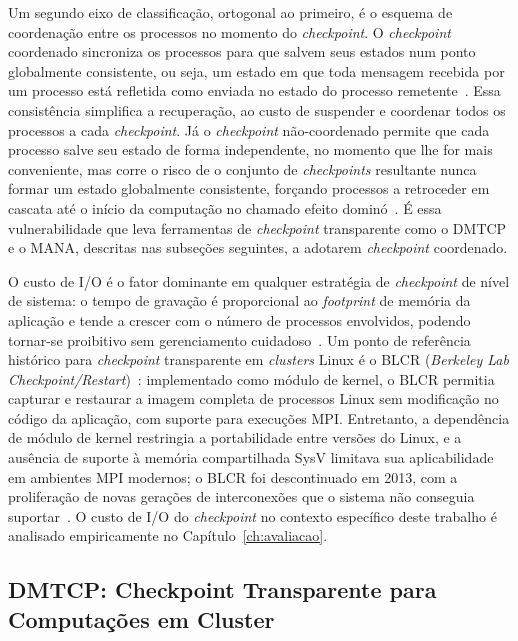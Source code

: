 Um segundo eixo de classificação, ortogonal ao primeiro, é o esquema de coordenação
entre os processos no momento do \textit{checkpoint}. O \textit{checkpoint} coordenado sincroniza os
processos para que salvem seus estados num ponto globalmente consistente, ou seja, um
estado em que toda mensagem recebida por um processo está refletida como enviada no
estado do processo remetente~\cite{elnozahy2002survey}. Essa consistência simplifica a
recuperação, ao custo de suspender e coordenar todos os processos a cada \textit{checkpoint}. Já
o \textit{checkpoint} não-coordenado permite que cada processo salve seu estado de forma
independente, no momento que lhe for mais conveniente, mas corre o risco de o conjunto
de \textit{checkpoints} resultante nunca formar um estado globalmente consistente, forçando
processos a retroceder em cascata até o início da computação no chamado efeito
dominó~\cite{elnozahy2002survey}. É essa vulnerabilidade que leva ferramentas de
\textit{checkpoint} transparente como o DMTCP e o MANA, descritas nas subseções seguintes, a
adotarem \textit{checkpoint} coordenado.

O custo de I/O é o fator dominante em qualquer estratégia de \textit{checkpoint} de nível de
sistema: o tempo de gravação é proporcional ao \textit{footprint} de memória da
aplicação e tende a crescer com o número de processos envolvidos, podendo tornar-se
proibitivo sem gerenciamento cuidadoso~\cite{garg2019mana}. Um ponto de referência
histórico para \textit{checkpoint} transparente em \textit{clusters} Linux é o BLCR (\textit{Berkeley Lab
Checkpoint/Restart})~\cite{hargrove2006blcr}: implementado como módulo de kernel, o
BLCR permitia capturar e restaurar a imagem completa de processos Linux sem modificação
no código da aplicação, com suporte para execuções MPI. Entretanto, a dependência de
módulo de kernel restringia a portabilidade entre versões do Linux, e a ausência de
suporte à memória compartilhada SysV limitava sua aplicabilidade em ambientes MPI
modernos; o BLCR foi descontinuado em 2013, com a proliferação de novas gerações de
interconexões que o sistema não conseguia suportar~\cite{garg2019mana}. O custo de I/O
do \textit{checkpoint} no contexto específico deste trabalho é analisado empiricamente no
Capítulo~\ref{ch:avaliacao}.

\subsection[DMTCP: Checkpoint Transparente]{DMTCP: Checkpoint Transparente para Computações em Cluster}
\label{sec:dmtcp}

